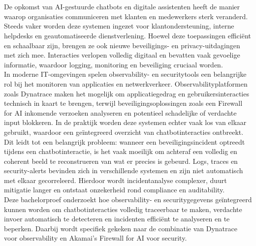 
\chapter{}%
\label{ch:inleiding}

De opkomst van AI-gestuurde chatbots en digitale assistenten heeft de manier waarop organisaties communiceren met klanten en medewerkers sterk veranderd. Steeds vaker worden deze systemen ingezet voor klantondersteuning, interne helpdesks en geautomatiseerde dienstverlening. Hoewel deze toepassingen efficiënt en schaalbaar zijn, brengen ze ook nieuwe beveiligings- en privacy-uitdagingen met zich mee. Interacties verlopen volledig digitaal en bevatten vaak gevoelige informatie, waardoor logging, monitoring en beveiliging cruciaal worden.\\

In moderne IT-omgevingen spelen observability- en securitytools een belangrijke rol bij het monitoren van applicaties en netwerkverkeer. Observabilityplatformen zoals Dynatrace maken het mogelijk om applicatiegedrag en gebruikersinteracties technisch in kaart te brengen, terwijl beveiligingsoplossingen zoals een Firewall for AI inkomende verzoeken analyseren en potentieel schadelijke of verdachte input blokkeren. In de praktijk worden deze systemen echter vaak los van elkaar gebruikt, waardoor een geïntegreerd overzicht van chatbotinteracties ontbreekt.\\

Dit leidt tot een belangrijk probleem: wanneer een beveiligingsincident optreedt tijdens een chatbotinteractie, is het vaak moeilijk om achteraf een volledig en coherent beeld te reconstrueren van wat er precies is gebeurd. Logs, traces en security-alerts bevinden zich in verschillende systemen en zijn niet automatisch met elkaar gecorreleerd. Hierdoor wordt incidentanalyse complexer, duurt mitigatie langer en ontstaat onzekerheid rond compliance en auditability.\\

Deze bachelorproef onderzoekt hoe observability- en securitygegevens geïntegreerd kunnen worden om chatbotinteracties volledig traceerbaar te maken, verdachte invoer automatisch te detecteren en incidenten efficiënt te analyseren en te beperken. Daarbij wordt specifiek gekeken naar de combinatie van Dynatrace voor observability en Akamai’s Firewall for AI voor security.\\

